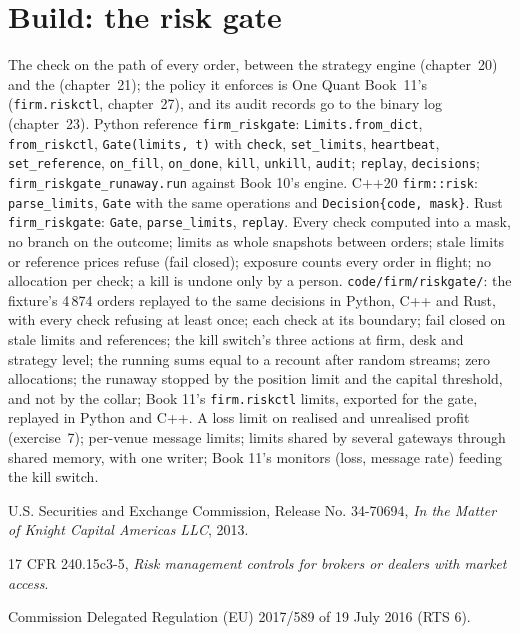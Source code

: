 \section{Build: the risk gate}\label{bld:ll:pre-trade-risk-and-kill-switches:riskgate}

\begin{build}
 The check on the path of every order, between the strategy engine (chapter~20) and the 
(chapter~21); the policy it enforces is One Quant Book~11's (\texttt{firm.riskctl}, chapter~27), and its audit records go to the
binary log (chapter~23).
 Python reference \texttt{firm\_riskgate}: \texttt{Limits.from\_dict}, \texttt{from\_riskctl},
\texttt{Gate(limits, t)} with \texttt{check}, \texttt{set\_limits}, \texttt{heartbeat}, \texttt{set\_reference},
\texttt{on\_fill}, \texttt{on\_done}, \texttt{kill}, \texttt{unkill}, \texttt{audit}; \texttt{replay}, \texttt{decisions};
\texttt{firm\_riskgate\_runaway.run} against Book 10's engine. C++20 \texttt{firm::risk}: \texttt{parse\_limits},
\texttt{Gate} with the same operations and \texttt{Decision\{code, mask\}}. Rust \texttt{firm\_riskgate}: \texttt{Gate},
\texttt{parse\_limits}, \texttt{replay}.
 Every check computed into a mask, no branch on the outcome; limits as whole snapshots between orders; stale limits
or reference prices refuse (fail closed); exposure counts every order in flight; no allocation per check; a kill is undone
only by a person.
 \texttt{code/firm/riskgate/}: the fixture's 4\,874 orders replayed to the same decisions in Python, C++
and Rust, with every check refusing at least once; each check at its boundary; fail closed on stale limits and references; the
kill switch's three actions at firm, desk and strategy level; the running sums equal to a recount after random streams; zero
allocations; the runaway stopped by the position limit and the capital threshold, and not by the collar; Book 11's
\texttt{firm.riskctl} limits, exported for the gate, replayed in Python and C++.
 A loss limit on realised and unrealised profit (exercise~7); per-venue message limits; limits shared by
several gateways through shared memory, with one writer; Book 11's monitors (loss, message rate) feeding the kill switch.
\end{build}

\begin{omsources}
\item U.S. Securities and Exchange Commission, Release No. 34-70694, \emph{In the Matter of Knight Capital Americas LLC}, 2013.
\item 17 CFR 240.15c3-5, \emph{Risk management controls for brokers or dealers with market access}.
\item Commission Delegated Regulation (EU) 2017/589 of 19 July 2016 (RTS 6).
\end{omsources}

